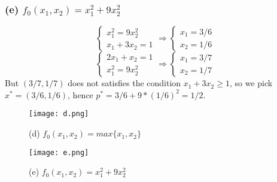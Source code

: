 \documentclass{article}
\begin{document}
  \subsubsection*{(e) $ f_0(x_1, x_2) = x_1^2 + 9x_2^2$}     
   \[ \begin{cases}
             x_1^2 = 9x_2^2 \\
            x_1 + 3x_2 = 1
        \end{cases} \Rightarrow
        \begin{cases}
            x_1 = 3/6 \\
           x_2 = 1/6
        \end{cases}  \]
          \[ \begin{cases}
            2x_1 + x_2 = 1 \\
             x_1^2 = 9x_2^2 
        \end{cases} \Rightarrow
        \begin{cases}
            x_1 = 3/7 \\
           x_2 = 1/7
        \end{cases}  \]
        But $(3/7, 1/7)$ does not satisfies the condition $x_1 + 3x_2 \ge 1$, so we pick $x^* = (3/6, 1/6)$, hence $p^* = 3/6+ 9*(1/6)^2 = 1/2$.
        \begin{figure}
\centering
\begin{minipage}{.5\textwidth}
  \centering
  \texttt{[image: d.png]}
  \caption{(d) $ f_0(x_1, x_2) = max \{x_1, x_2\}$}

\end{minipage}%
\begin{minipage}{.5\textwidth}
  \centering
  \texttt{[image: e.png]}
  \caption{(e) $ f_0(x_1, x_2) = x_1^2 + 9x_2^2$}

\end{minipage}
\end{figure}
\end{document}
